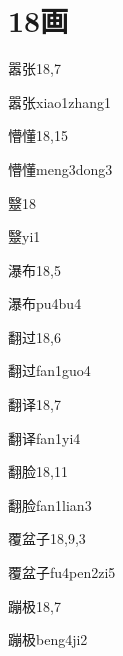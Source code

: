 
\section*{18画}

\begin{entry}{嚣张}{18,7}
  \begin{phonetics}{嚣张}{xiao1zhang1}
  \end{phonetics}
\end{entry}

\begin{entry}{懵懂}{18,15}
  \begin{phonetics}{懵懂}{meng3dong3}
  \end{phonetics}
\end{entry}

\begin{entry}{毉}{18}
  \begin{phonetics}{毉}{yi1}
  \end{phonetics}
\end{entry}

\begin{entry}{瀑布}{18,5}
  \begin{phonetics}{瀑布}{pu4bu4}
  \end{phonetics}
\end{entry}

\begin{entry}{翻过}{18,6}
  \begin{phonetics}{翻过}{fan1guo4}
  \end{phonetics}
\end{entry}

\begin{entry}{翻译}{18,7}
  \begin{phonetics}{翻译}{fan1yi4}
  \end{phonetics}
\end{entry}

\begin{entry}{翻脸}{18,11}
  \begin{phonetics}{翻脸}{fan1lian3}
  \end{phonetics}
\end{entry}

\begin{entry}{覆盆子}{18,9,3}
  \begin{phonetics}{覆盆子}{fu4pen2zi5}
  \end{phonetics}
\end{entry}

\begin{entry}{蹦极}{18,7}
  \begin{phonetics}{蹦极}{beng4ji2}
  \end{phonetics}
\end{entry}


